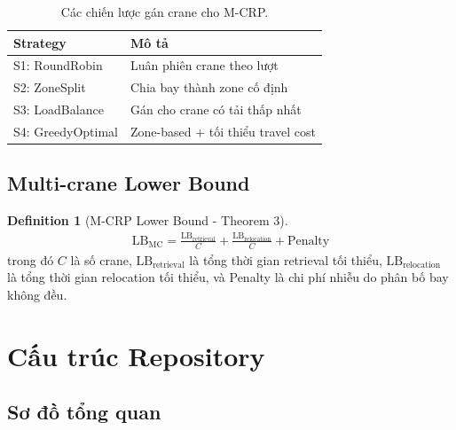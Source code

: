 \documentclass[11pt,a4paper]{article}
\theoremstyle{definition}
\newtheorem{definition}{Definition}[section]
\begin{document}
\begin{table}[h!]
    \centering
    \begin{tabular}{ll}
        \toprule
        Strategy & Mô tả \\
        \midrule
        S1: RoundRobin & Luân phiên crane theo lượt \\
        S2: ZoneSplit & Chia bay thành zone cố định \\
        S3: LoadBalance & Gán cho crane có tải thấp nhất \\
        S4: GreedyOptimal & Zone-based + tối thiểu travel cost \\
        \bottomrule
    \end{tabular}
    \caption{Các chiến lược gán crane cho M-CRP.}
    \label{tab:strategies}
\end{table}

\subsection{Multi-crane Lower Bound}

\begin{definition}[M-CRP Lower Bound - Theorem 3]
\begin{align}
    \text{LB}_{\text{MC}} = \frac{\text{LB}_{\text{retrieval}}}{C} + \frac{\text{LB}_{\text{relocation}}}{C} + \text{Penalty}
\end{align}
trong đó $C$ là số crane, $\text{LB}_{\text{retrieval}}$ là tổng thời gian retrieval tối thiểu, $\text{LB}_{\text{relocation}}$ là tổng thời gian relocation tối thiểu, và Penalty là chi phí nhiễu do phân bố bay không đều.
\end{definition}

\newpage

\section{Cấu trúc Repository}

\subsection{Sơ đồ tổng quan}
\end{document}
